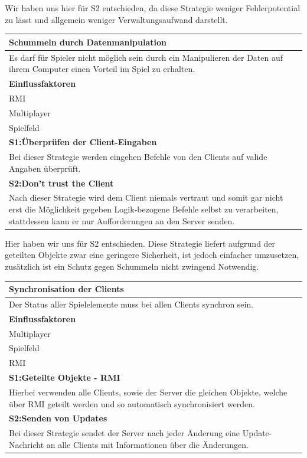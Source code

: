 \documentclass[fontsize=12pt,paper=a4,twoside]{scrartcl}
\begin{document}
Wir haben uns hier für S2 entschieden, da diese Strategie weniger Fehlerpotential zu lässt und allgemein weniger Verwaltungsaufwand darstellt.

\begin{tabular}{|p{15cm}|}
	\hline
	\bfseries{Schummeln durch Datenmanipulation}\\ \hline
	Es darf für Spieler nicht möglich sein durch ein Manipulieren der Daten auf ihrem Computer einen Vorteil im Spiel zu erhalten.\\ 
	\textbf{Einflussfaktoren}\\
	RMI\\ 
	Multiplayer\\ 
	Spielfeld\\ \hline
	\textbf{S1:Überprüfen der Client-Eingaben}\\
	Bei dieser Strategie werden eingehen Befehle von den Clients auf valide Angaben überprüft.\\ \hline
	\textbf{S2:Don't trust the Client}\\
	Nach dieser Strategie wird dem Client niemals vertraut und somit gar nicht erst die Möglichkeit gegeben Logik-bezogene Befehle selbst zu verarbeiten, stattdessen kann er nur Aufforderungen an den Server senden.\\ \hline
\end{tabular} 

Hier haben wir uns für S2 entschieden. Diese Strategie liefert aufgrund der geteilten Objekte zwar eine geringere Sicherheit, ist jedoch einfacher umzusetzen, zusätzlich ist ein Schutz gegen Schummeln nicht zwingend Notwendig.

\begin{tabular}{|p{15cm}|}
	\hline
	\bfseries{Synchronisation der Clients}\\ \hline
	Der Status aller Spielelemente muss bei allen Clients synchron sein.\\ 
	\textbf{Einflussfaktoren}\\
	Multiplayer\\ 
	Spielfeld\\ 
	RMI\\ \hline
	\textbf{S1:Geteilte Objekte - RMI}\\
	Hierbei verwenden alle Clients, sowie der Server die gleichen Objekte, welche über RMI geteilt werden und so automatisch synchronisiert werden.\\ \hline
	\textbf{S2:Senden von Updates}\\
	Bei dieser Strategie sendet der Server nach jeder Änderung eine Update-Nachricht an alle Clients mit Informationen über die Änderungen.\\ \hline
\end{tabular} 
\end{document}
